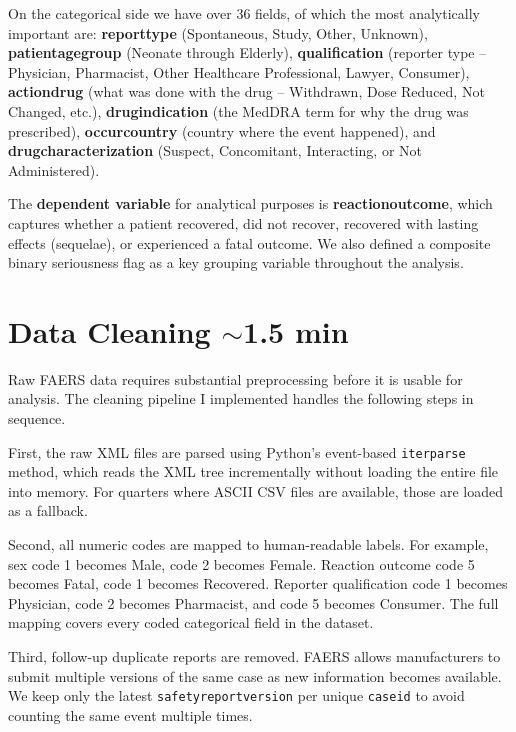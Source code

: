 \documentclass[12pt, letterpaper]{article}
\begin{document}
On the categorical side we have over 36 fields, of which the most analytically
important are: \textbf{reporttype} (Spontaneous, Study, Other, Unknown),
\textbf{patientagegroup} (Neonate through Elderly), \textbf{qualification}
(reporter type -- Physician, Pharmacist, Other Healthcare Professional, Lawyer,
Consumer), \textbf{actiondrug} (what was done with the drug -- Withdrawn,
Dose Reduced, Not Changed, etc.), \textbf{drugindication} (the MedDRA term for
why the drug was prescribed), \textbf{occurcountry} (country where the event
happened), and \textbf{drugcharacterization} (Suspect, Concomitant,
Interacting, or Not Administered).

The \textbf{dependent variable} for analytical purposes is
\textbf{reactionoutcome}, which captures whether a patient recovered, did not
recover, recovered with lasting effects (sequelae), or experienced a fatal
outcome. We also defined a composite binary seriousness flag as a key grouping
variable throughout the analysis.

\section{Data Cleaning \hfill \textcolor{slidenumber}{\small $\sim$1.5 min}}

Raw FAERS data requires substantial preprocessing before it is usable for
analysis. The cleaning pipeline I implemented handles the following steps in
sequence.

First, the raw XML files are parsed using Python's event-based
\texttt{iterparse} method, which reads the XML tree incrementally without
loading the entire file into memory. For quarters where ASCII CSV files are
available, those are loaded as a fallback.

Second, all numeric codes are mapped to human-readable labels. For example,
sex code 1 becomes Male, code 2 becomes Female. Reaction outcome code 5 becomes
Fatal, code 1 becomes Recovered. Reporter qualification code 1 becomes
Physician, code 2 becomes Pharmacist, and code 5 becomes Consumer. The full
mapping covers every coded categorical field in the dataset.

Third, follow-up duplicate reports are removed. FAERS allows manufacturers to
submit multiple versions of the same case as new information becomes available.
We keep only the latest \texttt{safetyreportversion} per unique \texttt{caseid}
to avoid counting the same event multiple times.
\end{document}
